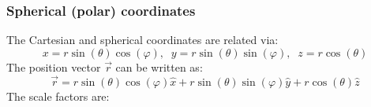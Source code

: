 \documentclass[11pt]{article}
\begin{document}
                \subsubsection{Spherical (polar) coordinates}
                    The Cartesian and spherical coordinates are related via:
                    \begin{equation}
                        \label{eq:equation20}
                        x = r \sin(\theta)\cos(\varphi), \; \; y = r \sin(\theta)\sin(\varphi), \; \; z = r\cos(\theta)
                    \end{equation}
                    The position vector $\vec{r}$ can be written as:
                    \begin{equation}
                        \label{eq:equation21}
                        \vec{r} = r \sin(\theta)\cos(\varphi)\hat{x} + r\sin(\theta)\sin(\varphi)\hat{y} + r \cos(\theta)\hat{z}
                    \end{equation}
                    The scale factors are:
\end{document}
